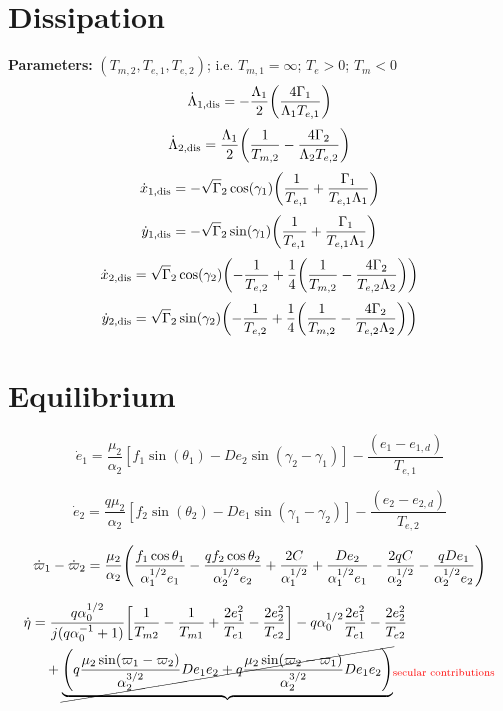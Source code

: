 \documentclass[12pt]{article}
\DeclarePairedDelimiter{\br}{[}{]}
\DeclarePairedDelimiter{\p}{(}{)}
\begin{document}
\section{Dissipation}
\textbf{Parameters:} $(T_{m,2}, T_{e,1}, T_{e,2})$; i.e. $T_{m,1} = \infty$; $T_e>0$; $T_m<0$
\begin{equation}
  \dot{\Lambda}_{1,\rm{dis}} = -\frac{\Lambda_1}{2}\p*{\frac{4\Gamma_1}{\Lambda_1T_{e,1}}}
\end{equation}
\begin{equation}
  \dot{\Lambda}_{2,\rm{dis}} = \frac{\Lambda_1}{2}\p*{\frac{1}{T_{m,2}}-\frac{4\Gamma_2}{\Lambda_2T_{e,2}}}
\end{equation}
\begin{equation}
 \dot x_{1,\rm{dis}} = -\sqrt \Gamma_2\cos(\gamma_1) \p*{\frac{1}{T_{e,1}} + \frac{\Gamma_1}{T_{e,1}\Lambda_1}}
\end{equation}
\begin{equation}
 \dot y_{1,\rm{dis}} = -\sqrt \Gamma_2\sin(\gamma_1) \p*{\frac{1}{T_{e,1}} + \frac{\Gamma_1}{T_{e,1}\Lambda_1}}
\end{equation}
\begin{equation}
 \dot x_{2,\rm{dis}} = \sqrt \Gamma_2\cos(\gamma_2) \p*{-\frac{1}{T_{e,2}} +\frac14\p*{\frac{1}{T_{m,2}}- \frac{4\Gamma_2}{T_{e,2}\Lambda_2}}}
\end{equation}
\begin{equation}
 \dot y_{2,\rm{dis}} = \sqrt \Gamma_2\sin(\gamma_2) \p*{-\frac{1}{T_{e,2}} +\frac14\p*{\frac{1}{T_{m,2}}- \frac{4\Gamma_2}{T_{e,2}\Lambda_2}}}
\end{equation}
\section{Equilibrium}
\begin{equation}
  \dot e_1 = \frac{\mu_2}{\alpha_2} [f_1\sin(\theta_1) - De_2 \sin(\gamma_2-\gamma_1)] - \frac{(e_1 - e_{1,d})}{T_{e,1}}
\end{equation}

\begin{equation}
  \dot e_2 = \frac{q\mu_2}{\alpha_2} [f_2\sin(\theta_2) - De_1 \sin(\gamma_1-\gamma_2)]- \frac{(e_2 - e_{2,d})}{T_{e,2}}
\end{equation}

\begin{equation}
  \dot\varpi_1-\dot\varpi_2 = \frac{\mu_2}{\alpha_2}\p*{ \frac{f_1\cos\theta_1}{\alpha_1^{1/2} e_1} - \frac{qf_2\cos\theta_2}{\alpha_2^{1/2}e_2}
    + \frac{2C}{\alpha_1^{1/2}} + \frac{De_2}{\alpha_1^{1/2} e_1} - \frac{2qC}{\alpha_2^{1/2}} - \frac{qDe_1}{ \alpha_2^{1/2}e_2}}
\end{equation}

\begin{align*}
  \dot\eta &= \frac{q\alpha_0^{1/2}}{j(q\alpha_0^{-1}+1)}\br*{ \frac{1}{T_{m2}} - \frac{1}{T_{m1}}
      + \frac{2e_1^2}{T_{e1}}- \frac{2e_2^2}{T_{e2}}}
    - q\alpha_0^{1/2}\frac{2e_1^2}{T_{e1}} - \frac{2e_2^2}{T_{e2}}\\
    &\quad+ \cancel{\underbrace{\p*{q \frac{\mu_2\sin(\varpi_1 -\varpi_2)}{\alpha_2^{3/2}}De_1e_2
      + q\frac{\mu_2\sin(\varpi_2 -\varpi_1)}{\alpha_2^{3/2}}De_1e_2}}}_{{\color{red}\text{secular contributions}}}
\end{align*}
\end{document}
